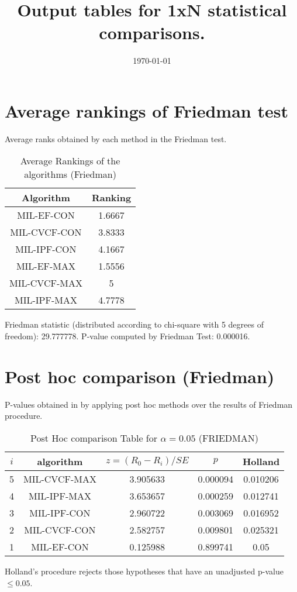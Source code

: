 \documentclass[a4paper,10pt]{article}
\title{Output tables for 1xN statistical comparisons.}
\author{}
\date{\today}
\begin{document}
\begin{landscape}
\pagestyle{empty}
\maketitle
\thispagestyle{empty}

\section{Average rankings of Friedman test}


Average ranks obtained by each method in the Friedman test.

\begin{table}[!htp]
\centering
\begin{tabular}{|c|c|}\hline
Algorithm&Ranking\\\hline
MIL-EF-CON&1.6667\\MIL-CVCF-CON&3.8333\\MIL-IPF-CON&4.1667\\MIL-EF-MAX&1.5556\\MIL-CVCF-MAX&5\\MIL-IPF-MAX&4.7778\\\hline\end{tabular}
\caption{Average Rankings of the algorithms (Friedman)}
\end{table}

Friedman statistic (distributed according to chi-square with 5 degrees of freedom): 29.777778. \newline P-value computed by Friedman Test: 0.000016.\newline


\newpage

\section{Post hoc comparison (Friedman)}


P-values obtained in by applying post hoc methods over the results of Friedman procedure.

\begin{table}[!htp]
\centering\footnotesize
\begin{tabular}{ccccc}
$i$&algorithm&$z=(R_0 - R_i)/SE$&$p$&Holland\\
\hline5&MIL-CVCF-MAX&3.905633&0.000094&0.010206\\4&MIL-IPF-MAX&3.653657&0.000259&0.012741\\3&MIL-IPF-CON&2.960722&0.003069&0.016952\\2&MIL-CVCF-CON&2.582757&0.009801&0.025321\\1&MIL-EF-CON&0.125988&0.899741&0.05\\\hline
\end{tabular}
\caption{Post Hoc comparison Table for $\alpha=0.05$ (FRIEDMAN)}
\end{table}Holland's procedure rejects those hypotheses that have an unadjusted p-value $\le0.05$.



\end{landscape}
\end{document}
